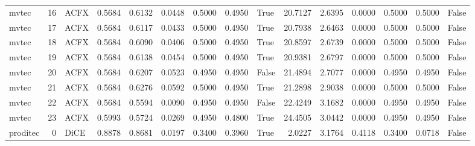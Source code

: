 \begin{tabular}{lrlrrrrrlrrrrrl}
   mvtec &     16 &   ACFX &      0.5684 &    0.6132 &       0.0448 &                 0.5000 &           0.4950 &            True &      20.7127 &                  2.6395 &                              0.0000 &         0.5000 &                0.5000 &                 False \\
   mvtec &     17 &   ACFX &      0.5684 &    0.6117 &       0.0433 &                 0.5000 &           0.4950 &            True &      20.7938 &                  2.6463 &                              0.0000 &         0.5000 &                0.5000 &                 False \\
   mvtec &     18 &   ACFX &      0.5684 &    0.6090 &       0.0406 &                 0.5000 &           0.4950 &            True &      20.8597 &                  2.6739 &                              0.0000 &         0.5000 &                0.5000 &                 False \\
   mvtec &     19 &   ACFX &      0.5684 &    0.6138 &       0.0454 &                 0.5000 &           0.4950 &            True &      20.9381 &                  2.6797 &                              0.0000 &         0.5000 &                0.5000 &                 False \\
   mvtec &     20 &   ACFX &      0.5684 &    0.6207 &       0.0523 &                 0.4950 &           0.4950 &           False &      21.4894 &                  2.7077 &                              0.0000 &         0.4950 &                0.4950 &                 False \\
   mvtec &     21 &   ACFX &      0.5684 &    0.6276 &       0.0592 &                 0.5000 &           0.4950 &            True &      21.2898 &                  2.9038 &                              0.0000 &         0.5000 &                0.5000 &                 False \\
   mvtec &     22 &   ACFX &      0.5684 &    0.5594 &       0.0090 &                 0.4950 &           0.4950 &           False &      22.4249 &                  3.1682 &                              0.0000 &         0.4950 &                0.4950 &                 False \\
   mvtec &     23 &   ACFX &      0.5993 &    0.5724 &       0.0269 &                 0.4950 &           0.4800 &            True &      24.4505 &                  3.0442 &                              0.0000 &         0.4950 &                0.4950 &                 False \\
proditec &      0 &   DiCE &      0.8878 &    0.8681 &       0.0197 &                 0.3400 &           0.3960 &            True &       2.0227 &                  3.1764 &                              0.4118 &         0.3400 &                0.0718 &                 False \\

\end{tabular}
